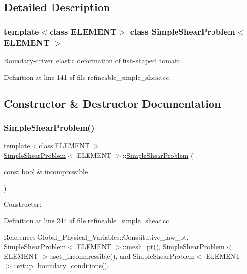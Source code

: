 \subsection{Detailed Description}
\subsubsection*{template$<$class E\+L\+E\+M\+E\+NT$>$\newline
class Simple\+Shear\+Problem$<$ E\+L\+E\+M\+E\+N\+T $>$}

Boundary-\/driven elastic deformation of fish-\/shaped domain. 

Definition at line 141 of file refineable\+\_\+simple\+\_\+shear.\+cc.



\subsection{Constructor \& Destructor Documentation}
\mbox{\label{classSimpleShearProblem_ada0881781b3332f88362528be39613d2}} 
\subsubsection{\texorpdfstring{Simple\+Shear\+Problem()}{SimpleShearProblem()}\hspace{0.1cm}{\footnotesize\ttfamily [1/2]}}
{\footnotesize\ttfamily template$<$class E\+L\+E\+M\+E\+NT $>$ \\
\hyperlink{classSimpleShearProblem}{Simple\+Shear\+Problem}$<$ E\+L\+E\+M\+E\+NT $>$\+::\hyperlink{classSimpleShearProblem}{Simple\+Shear\+Problem} (\begin{DoxyParamCaption}\item[{const bool \&}]{incompressible }\end{DoxyParamCaption})}



Constructor\+: 



Definition at line 244 of file refineable\+\_\+simple\+\_\+shear.\+cc.



References Global\+\_\+\+Physical\+\_\+\+Variables\+::\+Constitutive\+\_\+law\+\_\+pt, Simple\+Shear\+Problem$<$ E\+L\+E\+M\+E\+N\+T $>$\+::mesh\+\_\+pt(), Simple\+Shear\+Problem$<$ E\+L\+E\+M\+E\+N\+T $>$\+::set\+\_\+incompressible(), and Simple\+Shear\+Problem$<$ E\+L\+E\+M\+E\+N\+T $>$\+::setup\+\_\+boundary\+\_\+conditions().



